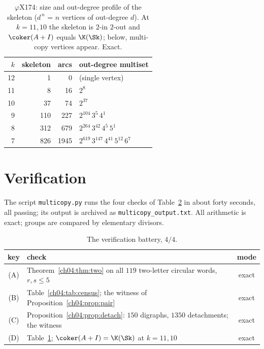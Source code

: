 \begin{table}[ht]
\centering\small
\begin{tabular}{rrrl}
\toprule
$k$ & skeleton & arcs & out-degree multiset\\
\midrule
12 &   1 &    0 & (single vertex)\\
11 &   8 &   16 & $2^{8}$\\
10 &  37 &   74 & $2^{37}$\\
 9 & 110 &  227 & $2^{104}\,3^{5}\,4^{1}$\\
 8 & 312 &  679 & $2^{264}\,3^{42}\,4^{5}\,5^{1}$\\
 7 & 826 & 1945 & $2^{619}\,3^{147}\,4^{41}\,5^{12}\,6^{7}$\\
\bottomrule
\end{tabular}
\caption{$\varphi$X174: size and out-degree profile of the skeleton ($d^{\,n}$ = $n$
vertices of out-degree $d$). At $k=11,10$ the skeleton is $2$-in $2$-out and
$\coker(A+I)$ equals $\K(\Sk)$; below, multi-copy vertices appear. Exact.}
\label{ch04:tab:phix}
\end{table}

\section{Verification}\label{ch04:sec:battery}

The script \texttt{multicopy.py} runs the four checks of Table~\ref{ch04:tab:battery} in
about forty seconds, all passing; its output is archived as
\texttt{multicopy\_output.txt}. All arithmetic is exact; groups are compared by
elementary divisors.

\begin{table}[ht]
\centering\small
\begin{tabular}{clc}
\toprule
key & check & mode\\
\midrule
(A) & Theorem~\ref{ch04:thm:two} on all $119$ two-letter circular words, $r,s\le5$ & exact\\
(B) & Table~\ref{ch04:tab:census}; the witness of Proposition~\ref{ch04:prop:pair} & exact\\
(C) & Proposition~\ref{ch04:prop:detach}: $150$ digraphs, $1350$ detachments; the witness & exact\\
(D) & Table~\ref{ch04:tab:phix}; $\coker(A+I)=\K(\Sk)$ at $k=11,10$ & exact\\
\bottomrule
\end{tabular}
\caption{The verification battery, $4/4$.}
\label{ch04:tab:battery}
\end{table}

